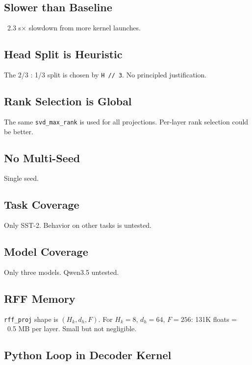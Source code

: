 \subsection{Slower than Baseline}

~2.3 s$\times$ slowdown from more kernel launches.

\subsection{Head Split is Heuristic}

The 2/3 : 1/3 split is chosen by \texttt{H // 3}. No principled justification.

\subsection{Rank Selection is Global}

The same \texttt{svd\_max\_rank} is used for all projections. Per-layer rank 
selection could be better.

\subsection{No Multi-Seed}

Single seed.

\subsection{Task Coverage}

Only SST-2. Behavior on other tasks is untested.

\subsection{Model Coverage}

Only three models. Qwen3.5 untested.

\subsection{RFF Memory}

\texttt{rff\_proj} shape is $(H_k, d_h, F)$. For $H_k = 8$, $d_h = 64$, $F = 256$: 
131K floats = ~0.5 MB per layer. Small but not negligible.

\subsection{Python Loop in Decoder Kernel}


